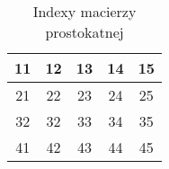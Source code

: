 \begin{table}
\centering
\begin{tabular}{|c|c|c|c|c|}
\hline
11 & 12 & 13 & 14 & 15 \\
\hline
21 & 22 & 23 & 24 & 25 \\
\hline
32 & 32 & 33 & 34 & 35 \\
\hline
41 & 42 & 43 & 44 & 45 \\
\hline
\end{tabular}
\label{tab:table3}
\caption{Indexy macierzy prostokatnej}
\end{table}